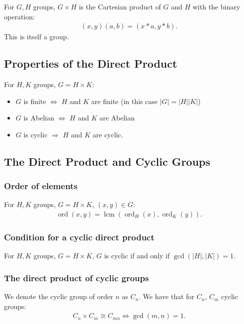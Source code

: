 \documentclass[a4paper, 12pt, twoside]{article}
\DeclareMathOperator{\Ord}{ord}
\DeclareMathOperator{\Gcd}{gcd}
\DeclareMathOperator{\Lcm}{lcm}
\begin{document}
For $G, H$ groups, $G \times H$ is the Cartesian product of $G$ and
$H$ with the binary operation:
\begin{align*}
      (x, y)(a, b) = (x * a, y * b). \tag{$\forall x, a \in G, y, b \in H$}
\end{align*}
This is itself a group.

\subsection{Properties of the Direct Product}

For $H, K$ groups, $G = H \times K$:

\begin{itemize}
      \item $G$ is finite $\Leftrightarrow$ $H$ and $K$ are finite 
            (in this case $|G| = |H||K|$)
      \item $G$ is Abelian $\Leftrightarrow$ $H$ and $K$ are Abelian
      \item $G$ is cyclic $\Rightarrow$ $H$ and $K$ are cyclic.
\end{itemize}

\subsection{The Direct Product and Cyclic Groups}

\subsubsection{Order of elements}

For $H, K$ groups, $G = H \times K$, $(x, y) \in G$:
\begin{align*}
      \Ord(x, y) = \Lcm(\Ord_H(x), \Ord_K(y)).
\end{align*}

\subsubsection{Condition for a cyclic direct product}

For $H, K$ groups, $G = H \times K$, $G$ is cyclic if and only if
$\Gcd(|H|, |K|) = 1$.

\subsubsection{The direct product of cyclic groups}

We denote the cyclic group of order $n$ as $C_n$. We have that
for $C_n$, $C_m$ cyclic groups:
\begin{align*}
      C_n \times C_m \cong C_{mn} \Leftrightarrow \Gcd(m, n) = 1.
\end{align*}
\end{document}
